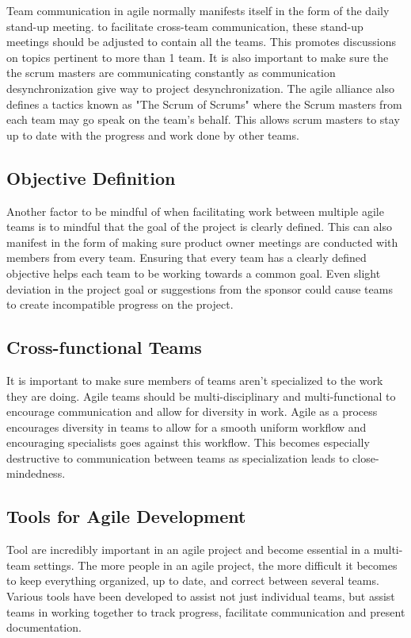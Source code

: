 \documentclass[sigplan,screen]{acmart}
\begin{document}
Team communication in agile normally manifests itself in the form of the daily stand-up meeting. to facilitate cross-team communication, these stand-up meetings should be adjusted to contain all the teams. This promotes discussions on topics pertinent to more than 1 team. It is also important to make sure the the scrum masters are communicating constantly as communication desynchronization give way to project desynchronization. The agile alliance also defines a tactics known as "The Scrum of Scrums" where the Scrum masters from each team may go speak on the team's behalf. This allows scrum masters to stay up to date with the progress and work done by other teams.

\subsection{Objective Definition}
Another factor to be mindful of when facilitating work between multiple agile teams is to mindful that the goal of the project is clearly defined. This can also manifest in the form of making sure product owner meetings are conducted  with members from every team. Ensuring that every team has a clearly defined objective helps each team to be working towards a common goal. Even slight deviation in the project goal or suggestions from the sponsor could cause teams to create incompatible progress on the project.

\subsection{Cross-functional Teams}
It is important to make sure members of teams aren't specialized to the work they are doing. Agile teams should be multi-disciplinary and multi-functional to encourage communication and allow for diversity in work. Agile as a process encourages diversity in teams to allow for a smooth uniform workflow and encouraging specialists goes against this workflow. This becomes especially destructive to communication between teams as specialization leads to close-mindedness.

\subsection{Tools for Agile Development}
Tool are incredibly important in an agile project and become essential in a multi-team settings. The more people in an agile project, the more difficult it becomes to keep everything organized, up to date, and correct between several teams. Various tools have been developed to assist not just individual teams, but assist teams in working together to track progress, facilitate communication and present documentation.
\end{document}
